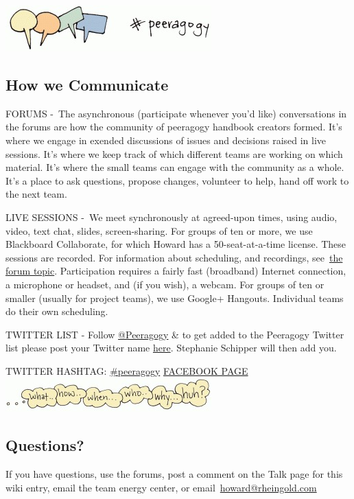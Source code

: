 \textbf{\href{http://peeragogy.org/wp-content/uploads/2012/03/communicate\_color1.gif}{\includegraphics{./pictures/communicate.jpg}}}

\subsection{How we Communicate}

FORUMS -~The asynchronous (participate whenever you'd like)
conversations in the forums are how the community of peeragogy handbook
creators formed. It's where we engage in exended discussions of issues
and decisions raised in live sessions. It's where we keep track of which
different teams are working on which material. It's where the small
teams can engage with the community as a whole. It's a place to ask
questions, propose changes, volunteer to help, hand off work to the next
team.

LIVE SESSIONS -~We meet synchronously at agreed-upon times, using audio,
video, text chat, slides, screen-sharing. For groups of ten or more, we
use Blackboard Collaborate, for which Howard has a 50-seat-at-a-time
license. These sessions are recorded. For information about scheduling,
and recordings,
see~\href{http://socialmediaclassroom.com/host/peeragogy/forum/live-sessions-schedule-recordings-notes-mindmaps}{the
forum topic}. Participation requires a fairly fast (broadband) Internet
connection, a microphone or headset, and (if you wish), a webcam. For
groups of ten or smaller (usually for project teams), we use Google+
Hangouts. Individual teams do their own scheduling.

TWITTER LIST - Follow \href{http://twitter.com/Peeragogy/}{@Peeragogy}
\& to get added to the Peeragogy Twitter list please post your Twitter
name
\href{http://socialmediaclassroom.com/host/peeragogy/forum/the-tools-we-are-using-and-how-access-them}{here}.
Stephanie Schipper will then add you.

TWITTER HASHTAG:
\href{http://twitter.com/search?q=\%23peeragogy\&src=typd}{\#peeragogy}
\href{https://www.facebook.com/peeragogy}{FACEBOOK PAGE} \textbf{~
\href{http://peeragogy.org/wp-content/uploads/2012/03/questions\_1000.gif}{\includegraphics{./pictures/questions.jpg}}}

\subsection{Questions?}

If you have questions, use the forums, post a comment on the Talk page
for this wiki entry, email the team energy center, or
email~\href{mailto:howard@rheingold.com}{howard@rheingold.com}

